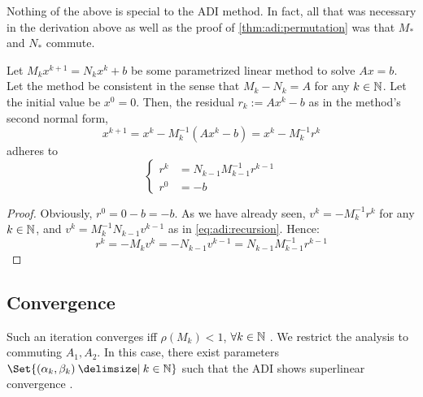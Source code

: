 Nothing of the above is special to the \ac{ADI} method.
In fact, all that was necessary in the derivation above as well as the proof of \autoref{thm:adi:permutation} was that $M_*$ and $N_*$ commute.

\begin{corollary}
  Let $M_k x^{k+1} = N_k x^k + b$ be some parametrized linear method to solve $Ax=b$.
  Let the method be consistent in the sense that $M_k - N_k = A$ for any $k\in\mathbb{N}$.
  Let the initial value be $x^0=0$.
  Then, the residual $r_k := Ax^k - b$ as in the method's second normal form,
  \begin{equation*}
    x^{k+1} = x^k - M_k^{-1} (Ax^k - b) = x^k - M_k^{-1} r^k
  \end{equation*}
  adheres to
  \begin{equation*}
  \left\{
  \begin{aligned}
    r^k &= N_{k-1} M_{k-1}^{-1} r^{k-1} \\
    r^0 &= -b
  \end{aligned}
  \right.
  \end{equation*}
\end{corollary}
\begin{proof}
  Obviously, $r^0 = 0-b = -b$.
  As we have already seen, $v^k = -M_k^{-1} r^k$ for any $k\in\mathbb{N}$,
  and $v^k = M_k^{-1} N_{k-1} v^{k-1}$ as in \eqref{eq:adi:recursion}.
  Hence:
  \begin{equation*}
    r^k
    = -M_k v^k
    = -N_{k-1} v^{k-1}
    = N_{k-1} M_{k-1}^{-1} r^{k-1}
  \end{equation*}
\end{proof}


\subsection{Convergence}

Such an iteration converges iff $\rho(M_k) < 1$, $\forall k\in\mathbb{N}$ \cite[Theorem~11.2.1]{Golub2013}.
We restrict the analysis to commuting $A_1, A_2$.
In this case,
there exist parameters $\Set{(\alpha_k, \beta_k) \given k\in\N}$
such that the \ac{ADI} shows
superlinear convergence \cite{Beckermann2010}.

